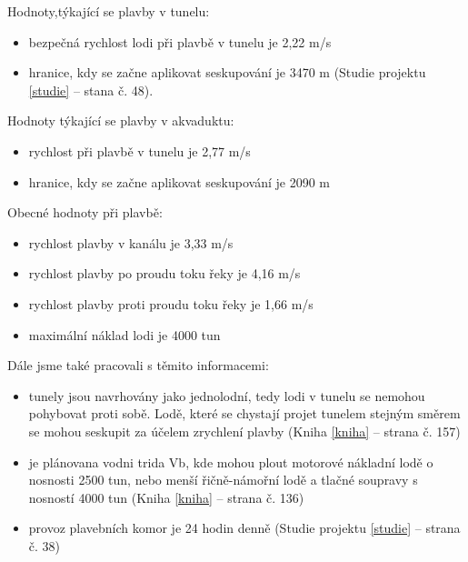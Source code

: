\documentclass[11pt,a4paper]{article}
\begin{document}
    \noindent
    Hodnoty,týkající se plavby v tunelu:

    \begin{itemize}
      \item bezpečná rychlost lodi při plavbě v tunelu je 2,22 m/s

      \item hranice, kdy se začne aplikovat seskupování je 3470 m
            (Studie projektu \ref{studie} -- stana č. 48).
    \end{itemize}

    \noindent
    Hodnoty týkající se plavby v akvaduktu:

    \begin{itemize}
      \item rychlost při plavbě v tunelu je 2,77 m/s
      \item hranice, kdy se začne aplikovat seskupování je 2090 m
    \end{itemize}

    \noindent
    Obecné hodnoty při plavbě:

    \begin{itemize}
      \item rychlost plavby v kanálu je 3,33 m/s
      \item rychlost plavby po proudu toku řeky je 4,16 m/s
      \item rychlost plavby proti proudu toku řeky je 1,66 m/s
      \item maximální náklad lodi je 4000 tun
    \end{itemize}

    \noindent
    Dále jsme také pracovali s těmito informacemi:

    \begin{itemize}
      \item tunely jsou navrhovány jako jednolodní, tedy lodi v tunelu se
            nemohou pohybovat proti sobě. Lodě, které se chystají projet
            tunelem stejným směrem se mohou seskupit za účelem zrychlení plavby
            (Kniha \ref{kniha} -- strana č. 157)
      \item je plánovana vodni trida Vb, kde mohou plout motorové nákladní lodě
            o nosnosti 2500 tun, nebo menší řičně-námořní lodě a tlačné
            soupravy s nosností 4000 tun
            (Kniha \ref{kniha} -- strana č. 136)
      \item provoz plavebních komor je 24 hodin denně
            (Studie projektu \ref{studie} -- strana č. 38)
    \end{itemize}
        
\end{document}

